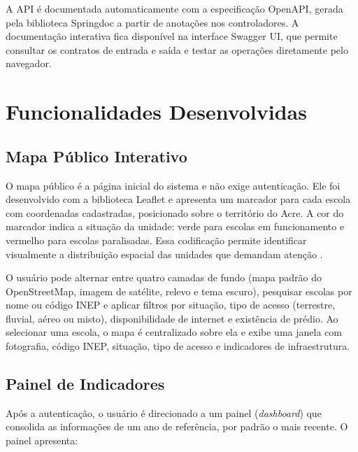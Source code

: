 A API é documentada automaticamente com a especificação OpenAPI, gerada pela biblioteca Springdoc a partir de anotações nos controladores. A documentação interativa fica disponível na interface Swagger UI, que permite consultar os contratos de entrada e saída e testar as operações diretamente pelo navegador.

\section{Funcionalidades Desenvolvidas}

\subsection{Mapa Público Interativo}

O mapa público é a página inicial do sistema e não exige autenticação. Ele foi desenvolvido com a biblioteca Leaflet \cite{leaflet2023} e apresenta um marcador para cada escola com coordenadas cadastradas, posicionado sobre o território do Acre. A cor do marcador indica a situação da unidade: verde para escolas em funcionamento e vermelho para escolas paralisadas. Essa codificação permite identificar visualmente a distribuição espacial das unidades que demandam atenção \cite{longley2013}.

O usuário pode alternar entre quatro camadas de fundo (mapa padrão do OpenStreetMap, imagem de satélite, relevo e tema escuro), pesquisar escolas por nome ou código INEP e aplicar filtros por situação, tipo de acesso (terrestre, fluvial, aéreo ou misto), disponibilidade de internet e existência de prédio. Ao selecionar uma escola, o mapa é centralizado sobre ela e exibe uma janela com fotografia, código INEP, situação, tipo de acesso e indicadores de infraestrutura.


\subsection{Painel de Indicadores}

Após a autenticação, o usuário é direcionado a um painel (\textit{dashboard}) que consolida as informações de um ano de referência, por padrão o mais recente. O painel apresenta:


